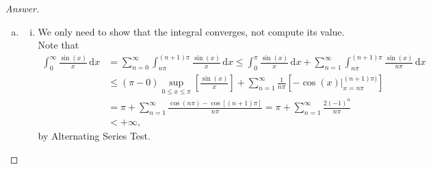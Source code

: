 \documentclass[12pt]{article}
\newcommand{\sqbrack}[1]{\left [ #1 \right ]}
\renewcommand{\i}[4]{\int_{#1}^{#2} {#3} \, \mathrm{d} {#4} }
\theoremstyle{definition}
\begin{document}
\begin{proof}[Answer]
    \noindent
    \begin{enumerate}[(a)]
        \item 
        \begin{enumerate}[(i)]
            \item We only need to show that the integral converges, not compute its value. Note that 
            \begin{align*}
                \i{0}{\infty}{ \frac{\sin(x)}{x} }{x} & = \sum\limits_{n = 0}^{\infty} \i{n \pi}{(n+1)\pi}{ \frac{\sin(x)}{x} }{x} \leq \i{0}{\pi}{\frac{\sin(x)}{x}}{x} + \sum\limits_{n = 1}^{\infty} \i{n \pi}{(n+1)\pi}{ \frac{\sin(x)}{n \pi} }{x} \\ 
                & \leq (\pi - 0) \sup\limits_{0 \leq x \leq \pi} \sqbrack{ \frac{\sin(x)}{x} } + \sum\limits_{n = 1}^{\infty} \frac{1}{n \pi}  \sqbrack{ \left. - \cos(x) \right|_{x = n\pi}^{(n+1)\pi)} } \\ 
                & = \pi + \sum\limits_{n = 1}^{\infty} \frac{ \cos(n\pi) - \cos \sqbrack{(n+1)\pi} }{n \pi} = \pi + \sum\limits_{n = 1}^{\infty} \frac{2(-1)^n}{n \pi} \\ 
                & < +\infty , 
            \end{align*}
            by Alternating Series Test. 
            

\end{enumerate}
\end{enumerate}
\end{proof}
\end{document}
